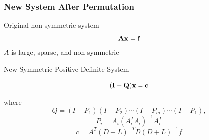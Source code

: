 \documentclass{beamer}
\begin{document}






\begin{frame}
\frametitle{New System After Permutation}

\begin{block}{Original non-symmetric system}
$${\bf A x = f}$$
$A$ is large, sparse, and non-symmetric
\end{block}


\begin{block}{New Symmetric Positive Definite System}

$${\bf (I-Q)x = c} $$

where
$$Q = (I-P_1)(I-P_2) \cdots (I-P_m) \cdots (I-P_1),$$
 $$P_i = A_i(A_i^TA_i)^{-1}A_i^T$$
 $$ c = A^{T}(D+L)^{-T}D(D+L)^{-1}f $$
\end{block}
\end{frame}
\end{document}
